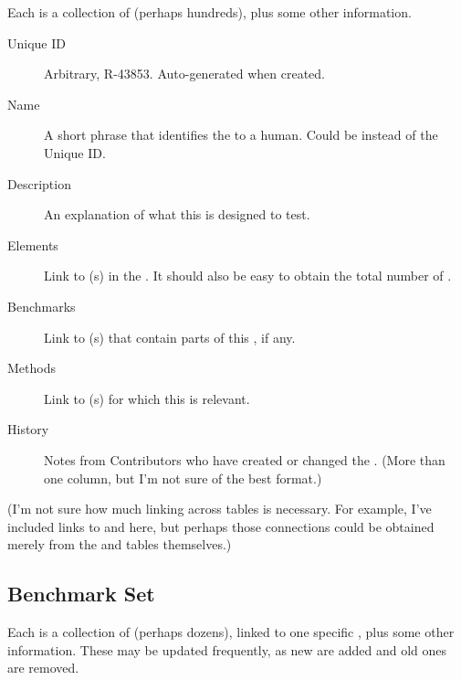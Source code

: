 Each \Refset is a collection of \Elements (perhaps hundreds), plus some other information.

\begin{description}
    \item[Unique ID] Arbitrary, \eg R-43853.  Auto-generated when created.
    \item[Name] A short phrase that identifies the \Refset to a human.  Could be instead of the Unique ID.
    \item[Description] An explanation of what this \Refset is designed to test.
    \item[Elements] Link to \Element(s) in the \Refset.  It should also be easy to obtain the total number of \Elements.
    \item[Benchmarks] Link to \Benchmark(s) that contain parts of this \Refset, if any.
    \item[Methods] Link to \Method(s) for which this \Refset is relevant.
    \item[History] Notes from Contributors who have created or changed the \Refset.  (More than one column, but I'm not sure of the best format.)
\end{description}

(I'm not sure how much linking across tables is necessary.
For example, I've included links to \Benchmark and \Method here, but perhaps those connections could be obtained merely from the \Benchmark and \Method tables themselves.)

\subsection{Benchmark Set}
\label{sec:tables_benchmark}

Each \Benchmark is a collection of \Elements (perhaps dozens), linked to one specific \Task, plus some other information.
These may be updated frequently, as new \Elements are added and old ones are removed.

